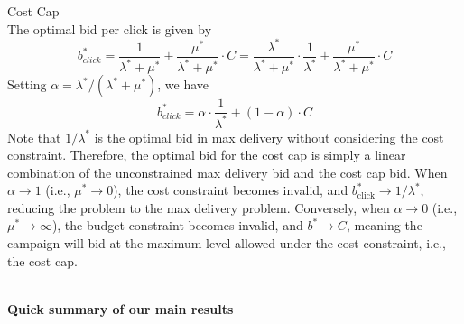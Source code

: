 \documentclass[../main.tex]{subfiles}
\begin{document}
\begin{section}{Cost Cap}
\begin{equation*}
	\end{equation*}
	The optimal bid per click is given by 
	\begin{equation}
		\label{eq:cost_cap_bid_formula}
		b^*_{click} = \frac{1}{\lambda^* + \mu^*} + \frac{\mu^*}{\lambda^* + \mu^*} \cdot C =  \frac{\lambda^*}{\lambda^* + \mu^*} \cdot \frac{1}{\lambda^*}+ \frac{\mu^*}{\lambda^* + \mu^*} \cdot C
	\end{equation}
    Setting $\alpha = \lambda^*/(\lambda^* + \mu^*)$, we have 
    \begin{equation}
    	b^*_{click}  =  \alpha \cdot \frac{1}{\lambda^*}+ (1-\alpha) \cdot C
    \end{equation}
	Note that \(1 / \lambda^*\) is the optimal bid in max delivery without considering the cost constraint. Therefore, the optimal bid for the cost cap is simply a linear combination of the unconstrained max delivery bid and the cost cap bid. When \(\alpha \to 1\) (i.e., \(\mu^* \to 0\)), the cost constraint becomes invalid, and \(b^*_{\text{click}} \to 1 / \lambda^*\), reducing the problem to the max delivery problem. Conversely, when \(\alpha \to 0\) (i.e., \(\mu^* \to \infty\)), the budget constraint becomes invalid, and \(b^* \to C\), meaning the campaign will bid at the maximum level allowed under the cost constraint, i.e., the cost cap.
	
	
	\textbf{\\Quick summary of our main results}
	
	\end{section}
	
\end{document}
